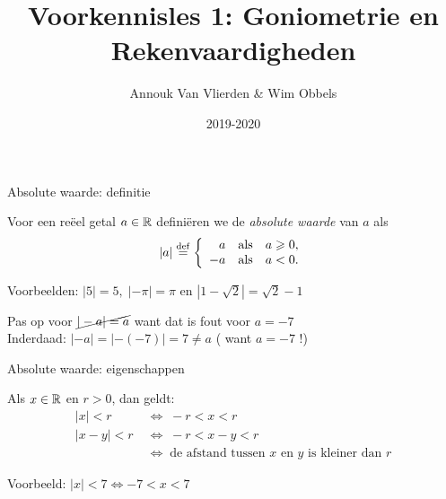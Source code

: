 \documentclass{beamer}
\title{Voorkennisles 1: Goniometrie en Rekenvaardigheden}
\author{Annouk Van Vlierden \& Wim Obbels}
\date{2019-2020}
\providecommand{\p}{\pause}
\begin{document}
\frame{\titlepage}

\begin{frame}{Absolute waarde: definitie}
\p
\begin{definition}
Voor een reëel getal $a\in \mathbb{R}$ definiëren we de \emph{absolute waarde} van $a$ als 
$$
|a|\overset{\mathrm{def}}{=} \left\{
\begin{array}{rll  } 
   a & \mbox{als}  & a \geqslant 0, \\
  -a & \mbox{als}  & a<0.\\
\end{array}\right.
$$
\end{definition}
\vfill\p


Voorbeelden: $|5|=5,\; |-\pi|=\pi$ en $|1-\sqrt{2}|=\sqrt{2}-1$
\vfill\p

Pas op voor $\cancel{|-a| = a}$ want dat is fout voor $a=-7$ \\
Inderdaad:  $|-a| = |-(-7)| = 7 \neq a $  ( want $a= -7$ !) 
\end{frame}

\begin{frame}{Absolute waarde: eigenschappen}  
\p
\begin{proposition}
     Als $x \in \mathbb{R}$ en $r>0 $, dan geldt: 
     \begin{align}
        |x|<r\; & \Leftrightarrow \; -r<x<r \\
        |x-y|<r\; & \Leftrightarrow \; -r<x-y<r \\
                  & \Leftrightarrow \; \text{de afstand tussen $x$ en $y$ is kleiner dan $r$}
      \end{align}
      
     
\end{proposition}
\p
Voorbeeld: $|x| < 7 \iff -7 < x < 7$
\end{frame}
\end{document}
